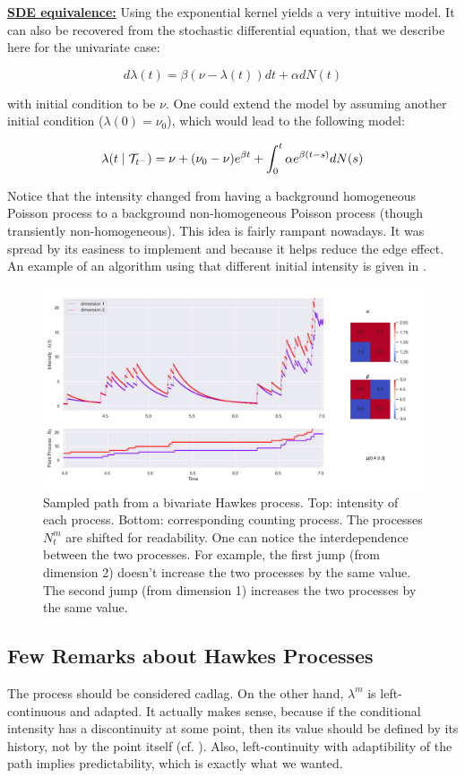 \underline{\textbf{SDE equivalence:}} Using the exponential kernel yields a very intuitive model. It can also be recovered from the stochastic differential equation, that we describe here for the univariate case:

$$ d \lambda (t) = \beta ( \nu - \lambda (t) ) dt + \alpha d N(t) $$

with initial condition to be $\nu$. One could extend the model by assuming another initial condition ($\lambda( 0 ) = \nu_0$), which would lead to the following model:

$$ \lambda(t \mid  \mathcal{T}_{t^-} ) = \nu +  ( \nu_0 - \nu )  e^{\beta t } +  \int_0^t \alpha e^{\beta ( t -s ) } d N(s) $$

Notice that the intensity changed from having a background homogeneous Poisson process to a background non-homogeneous Poisson process (though transiently non-homogeneous). This idea is fairly rampant nowadays. It was spread by its easiness to implement and because it helps reduce the edge effect. An example of an algorithm using that different initial intensity is given in \cite{simuldassios}.
\label{section:dassios}




\begin{figure}
\centering
\includegraphics[width = 0.9 \textwidth]{../imag/chap1/hawkes2.png}
\caption{Sampled path from a bivariate Hawkes process. Top: intensity of each process. Bottom: corresponding counting process. The processes $N_t^m$ are shifted for readability. One can notice the interdependence between the two processes. For example, the first jump (from dimension 2) doesn't increase the two processes by the same value. The second jump (from dimension 1) increases the two processes by the same value.}
\label{fig:hawkes2}
\end{figure}


\subsection{Few Remarks about Hawkes Processes}
\begin{remarque}
The process should be considered cadlag. On the other hand, $\lambda^m$ is left-continuous and adapted. It actually makes sense, because if the conditional intensity has a discontinuity at some point, then its value should be defined by its history, not by the point itself (cf. \cite{daley}). Also, left-continuity with adaptibility of the path implies predictability, which is exactly what we wanted.
\end{remarque}

